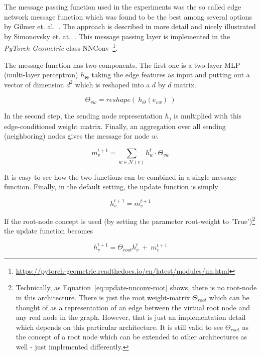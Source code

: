 The message passing function used in the experiments was the so called edge network message function which was found to be the best among several options by Gilmer et. al.~\cite{Gilmer2017}. The approach is described in more detail and nicely illustrated by Simonovsky et. at.~\cite{Simonovsky2017}. This message passing layer is implemented in the \textit{PyTorch Geometric} class NNConv~\footnote{\url{https://pytorch-geometric.readthedocs.io/en/latest/modules/nn.html}}\label{fn:pytorch-geometric-nn-docs}.


The message function has two components. The first one is a two-layer MLP (multi-layer perceptron)  $h_{\mathbf{\Theta}}$ taking the edge features as input and putting out a vector of dimension $d^2$ which is reshaped into a $d$ by $d$ matrix.

\begin{equation}
	\Theta_{vw} = reshape(~h_{\Theta}(e_{vw})~)
\end{equation}

In the second step, the sending node representation $h_j$ is multiplied with this edge-conditioned weight matrix. Finally, an aggregation over all sending (neighboring) nodes gives the message for node $w$.

\begin{equation}
 m_v^{t+1} = \sum_{w \in \mathcal{N}(v)} h_w^t \cdot \Theta_{vw}
\end{equation}

It is easy to see how the two functions can be combined in a single message-function. Finally, in the default setting, the update function is simply

\begin{equation}
	h_v^{t+1} = m_v^{t+1}
\end{equation}
\label{eq:update-nnconv-simple}

If the root-node concept is used (by setting the parameter root-weight to 'True')\footnote{
	Technically, as Equation~\ref{eq:update-nnconv-root} shows, there is no root-node in this architecture. There is just the root weight-matrix $\Theta_{root}$ which can be thought of as a representation of an edge between the virtual root node and any real node in the graph. However, that is just an implementation detail which depends on this particular architecture. It is still valid to see $\Theta_{root}$ as the concept of a root node which can be extended to other architectures as well - just implemented differently.
} the update function becomes

\begin{equation}
h_v^{t+1} = \Theta_{root}h_v^t~+~m_v^{t+1}
\end{equation}

